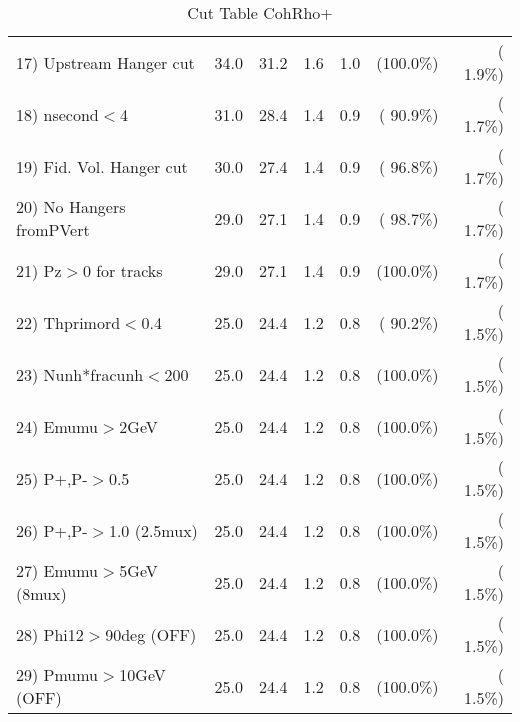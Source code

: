 \begin{table}[h!]
\begin{tabular}{||l||r|r|r|r|r|r||}
 17) Upstream Hanger cut  &         34.0 &         31.2 &          1.6 &          1.0 & (100.0\%) & (  1.9\%) \\
 18) nsecond$<$4          &         31.0 &         28.4 &          1.4 &          0.9 & ( 90.9\%) & (  1.7\%) \\
 19) Fid. Vol. Hanger cut &         30.0 &         27.4 &          1.4 &          0.9 & ( 96.8\%) & (  1.7\%) \\
 20) No Hangers fromPVert &         29.0 &         27.1 &          1.4 &          0.9 & ( 98.7\%) & (  1.7\%) \\
 21) Pz$>$0 for tracks    &         29.0 &         27.1 &          1.4 &          0.9 & (100.0\%) & (  1.7\%) \\
 22) Thprimord$<$0.4      &         25.0 &         24.4 &          1.2 &          0.8 & ( 90.2\%) & (  1.5\%) \\
 23) Nunh*fracunh$<$200   &         25.0 &         24.4 &          1.2 &          0.8 & (100.0\%) & (  1.5\%) \\
 24) Emumu$>$2GeV         &         25.0 &         24.4 &          1.2 &          0.8 & (100.0\%) & (  1.5\%) \\
 25) P+,P-$>$0.5          &         25.0 &         24.4 &          1.2 &          0.8 & (100.0\%) & (  1.5\%) \\
 26) P+,P-$>$1.0 (2.5mux) &         25.0 &         24.4 &          1.2 &          0.8 & (100.0\%) & (  1.5\%) \\
 27) Emumu$>$5GeV  (8mux) &         25.0 &         24.4 &          1.2 &          0.8 & (100.0\%) & (  1.5\%) \\
 28) Phi12$>$90deg  (OFF) &         25.0 &         24.4 &          1.2 &          0.8 & (100.0\%) & (  1.5\%) \\
 29) Pmumu$>$10GeV  (OFF) &         25.0 &         24.4 &          1.2 &          0.8 & (100.0\%) & (  1.5\%) \\
 \hline
 \hline
 \end{tabular}
 \caption{Cut Table  CohRho+  }
 \label{tab-cutcohjpsi-mumu_cohrhop}
 \end{table}
